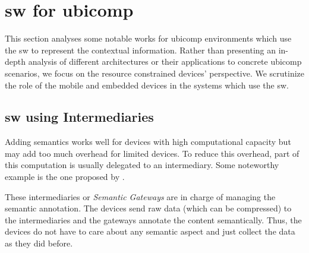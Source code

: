 \section{\acl{sw} for \acl{ubicomp}}
\label{sec:soa_sw_ubicomp}


This section analyses some notable works for \ac{ubicomp} environments which use the \acl{sw} to represent the contextual information.
Rather than presenting an in-depth analysis of different architectures or their applications to concrete \ac{ubicomp} scenarios,
we focus on the resource constrained devices' perspective.
We scrutinize the role of the mobile and embedded devices in the systems which use the \ac{sw}.


\subsection{\acl{sw} using Intermediaries}
\label{sec:sw_intermediaries}




Adding semantics works well for devices with high computational capacity but may add too much overhead for limited devices.
To reduce this overhead, part of this computation is usually delegated to an intermediary.
Some noteworthy example is the one proposed by \citet{broring_semantic_2009}.






These intermediaries or \emph{Semantic Gateways} are in charge of managing the semantic annotation.
The devices send raw data (which can be compressed) to the intermediaries and the gateways annotate the content semantically.
Thus, the devices do not have to care about any semantic aspect and just collect the data as they did before.

